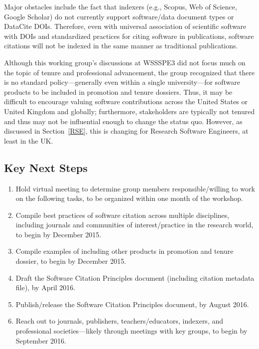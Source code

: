 Major obstacles include the fact that indexers (e.g., Scopus, Web of Science,
Google Scholar) do not currently support software/data document types or
DataCite DOIs. Therefore, even with universal association of scientific software
with DOIs and standardized practices for citing software in publications,
software citations will not be indexed in the same manner as traditional
publications.

Although this working group's discussions at WSSSPE3 did not focus much on the
topic of tenure and professional advancement, 
the group recognized that there is no standard
policy---generally even within a single university---for software products to be
included in promotion and tenure dossiers. Thus, it may be difficult to
encourage valuing software contributions across the United States or United
Kingdom and globally; furthermore, stakeholders are typically not tenured and
thus may not be influential enough to change the status quo.
However, as discussed in Section~\ref{RSE}, this is changing for Research Software Engineers, at least in the UK.

\subsection{Key Next Steps}
\label{SC:next-steps}

\begin{enumerate}

\item Hold virtual meeting to determine group members responsible\slash willing
to work on the following tasks, to be organized within one month of the workshop.

\item Compile best practices of software citation across multiple disciplines,
including journals and communities of interest\slash practice in the research
world, to begin by December 2015.

\item Compile examples of including other products in promotion and tenure
dossier, to begin by December 2015.

\item Draft the Software Citation Principles document (including citation
metadata file), by April 2016.

\item Publish\slash release the Software Citation Principles document, by August
2016.

\item Reach out to journals, publishers, teachers\slash educators, indexers, and
professional societies---likely through meetings with key groups, to begin by
September 2016.

\end{enumerate}

